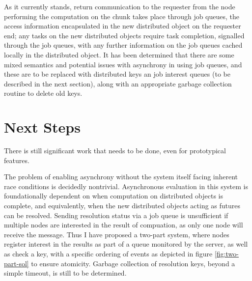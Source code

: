 \documentclass[a4paper,10pt]{article}
\begin{document}
As it currently stands, return communication to the requester from the node
performing the computation on the chunk takes place through job queues, the
access information encapsulated in the new distributed object on the requester
end; any tasks on the new distributed objects require task completion,
signalled through the job queues, with any further information on the job
queues cached locally in the distributed object.
It has been determined that there are some mixed semantics and potential issues
with asynchrony in using job queues, and these are to be replaced with
distributed keys an job interest queues (to be described in the next section),
along with an appropriate garbage collection routine to delete old keys.

\section{Next Steps}

There is still significant work that needs to be done, even for prototypical features.

The problem of enabling asynchrony without the system itself facing inherent
race conditions is decidedly nontrivial.
Asynchronous evaluation in this system is foundationally dependent on when
computation on distributed objects is complete, and equivalently, when the new
distributed objects acting as futures can be resolved.
Sending resolution status via a job queue is unsufficient if multiple nodes are
interested in the result of compuation, as only one node will receive the
message.
Thus I have proposed a two-part system, where nodes register interest in the
results as part of a queue monitored by the server, as well as check a key,
with a specific ordering of events as depicted in figure \ref{fig:two-part-sol}
to ensure atomicity. 
Garbage collection of resolution keys, beyond a simple timeout, is still to be
determined.
\end{document}

